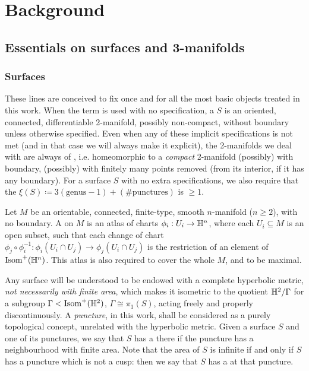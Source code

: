 \chapter{Background}\label{cha:background}

\section{Essentials on surfaces and 3-manifolds}

\subsection{Surfaces}\label{sub:surfaces}
These lines are conceived to fix once and for all the most basic objects treated in this work. When the term is used with no specification, a  $S$ is an oriented, connected, differentiable 2-manifold, possibly non-compact, without boundary unless otherwise specified. Even when any of these implicit specifications is not met (and in that case we will always make it explicit), the 2-manifolds we deal with are always of , i.e. homeomorphic to a \emph{compact} 2-manifold (possibly) with boundary, (possibly) with finitely many points removed (from its interior, if it has any boundary). For a surface $S$ with no extra specifications, we also require that the  $\xi(S)\coloneqq 3(\text{genus}-1)+ (\#\text{punctures})$ is $\geq 1$.

\begin{defin} \label{def:hyperbolic}
Let $M$ be an orientable, connected, finite-type, smooth $n$-manifold ($n\geq 2$), with no boundary. A  on $M$ is an atlas of charts $\phi_i:U_i\rightarrow \mathbb H^n$, where each $U_i\subseteq M$ is an open subset, such that each change of chart $\phi_j\circ\phi_i^{-1}:\phi_i(U_i\cap U_j)\rightarrow \phi_j(U_i\cap U_j)$ is the restriction of an element of $\mathrm{Isom}^+(\mathbb H^n)$. This atlas is also required to cover the whole $M$, and to be maximal.
\end{defin}

Any surface will be understood to be endowed with a complete hyperbolic metric, \emph{not necessarily with finite area}, which makes it isometric to the quotient $\mathbb H^2/\Gamma$ for a subgroup $\Gamma<\mathrm{Isom}^+(\mathbb H^2)$, $\Gamma\cong \pi_1(S)$, acting freely and properly discontinuously. A \emph{puncture}, in this work, shall be considered as a purely topological concept, unrelated with the hyperbolic metric. Given a surface $S$ and one of its punctures, we say that $S$ has a  there if the puncture has a neighbourhood with finite area. Note that the area of $S$ is infinite if and only if $S$ has a puncture which is not a cusp: then we say that $S$ has a  at that puncture.


